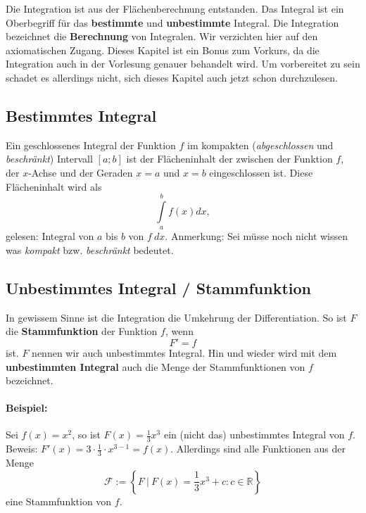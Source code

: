 Die Integration ist aus der Flächenberechnung entstanden. Das Integral ist ein Oberbegriff für das \textbf{bestimmte} und \textbf{unbestimmte} Integral. Die Integration bezeichnet die \textbf{Berechnung} von Integralen. Wir verzichten hier auf den axiomatischen Zugang. Dieses Kapitel ist ein Bonus zum Vorkurs, da die Integration auch in der Vorlesung genauer behandelt wird. Um vorbereitet zu sein schadet es allerdings nicht, sich dieses Kapitel auch jetzt schon durchzulesen.

\subsection{Bestimmtes Integral}
Ein geschlossenes Integral der Funktion $f$ im kompakten (\textit{abgeschlossen} und \textit{beschränkt}) Intervall $\left[ a; b \right]$ ist der Flächeninhalt der zwischen der Funktion $f$, der $x$-Achse und der Geraden $x = a$ und $x = b$ eingeschlossen ist. Diese Flächeninhalt wird als 
\begin{equation*}
\int\limits_a^b f(x) dx,
\end{equation*}
gelesen: Integral von $a$ bis $b$ von $f \ dx$. Anmerkung: Sei müsse noch nicht wissen was \textit{kompakt} bzw. \textit{beschränkt} bedeutet.

\subsection{Unbestimmtes Integral / Stammfunktion}
In gewissem Sinne ist die Integration die Umkehrung der Differentiation. So ist $F$ die \textbf{Stammfunktion} der Funktion $f$, wenn
\begin{equation*}
F' = f
\end{equation*}
ist. $F$ nennen wir auch unbestimmtes Integral. Hin und wieder wird mit dem \textbf{unbestimmten Integral} auch die Menge der Stammfunktionen von $f$ bezeichnet.
\paragraph{Beispiel:} Sei $f(x) = x^2$, so ist $F(x) = \frac{1}{3} x^3$ ein (nicht das) unbestimmtes Integral von $f$. Beweis: $F'(x) = 3 \cdot \frac{1}{3} \cdot x^{3-1} = f(x)$. Allerdings sind alle Funktionen aus der Menge 
\begin{equation*}
\mathcal{F} := \left\{ F \ | \ F(x) = \frac{1}{3} x^3 + c : c \in \mathbb{R} \right\}
\end{equation*}
eine Stammfunktion von $f$.

